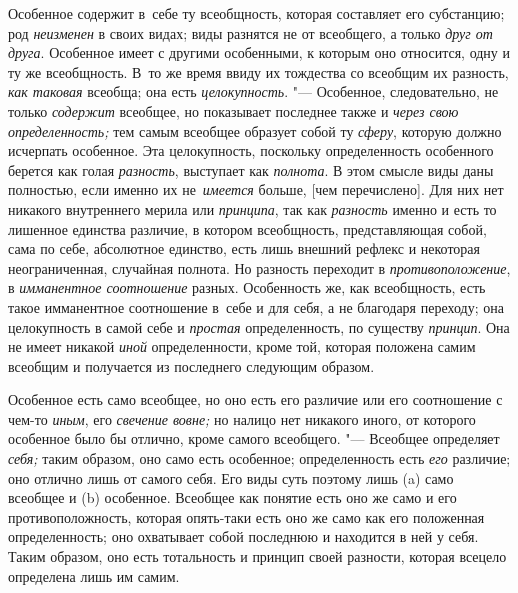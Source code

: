 Особенное содержит в~себе ту всеобщность, которая составляет его субстанцию;
род {\em неизменен} в своих видах; виды разнятся не от всеобщего, а только
{\em друг от друга}. Особенное имеет с другими особенными, к которым оно
относится, одну и ту же всеобщность. В~то же время ввиду их тождества со
всеобщим их разность,
{\em как таковая} всеобща; она есть {\em целокупность}. "--- Особенное,
следовательно, не только {\em содержит} всеобщее, но показывает последнее
также и {\em через свою определенность;} тем самым всеобщее образует собой
ту {\em сферу}, которую должно исчерпать особенное. Эта целокупность, поскольку
определенность особенного берется как голая {\em разность}, выступает как
{\em полнота}. В этом смысле виды даны полностью, если именно их
не~{\em имеется} больше, [чем перечислено]. Для них нет никакого внутреннего
мерила или {\em принципа}, так как {\em разность} именно и есть то лишенное
единства различие, в котором всеобщность, представляющая собой, сама по себе,
абсолютное единство, есть лишь внешний рефлекс и некоторая неограниченная,
случайная полнота. Но разность переходит в {\em противоположение},
в {\em имманентное соотношение} разных. Особенность же, как всеобщность, есть
такое имманентное соотношение в~себе и для себя, а не благодаря переходу; она
целокупность в самой себе и {\em простая} определенность, по существу
{\em принцип}. Она не имеет никакой {\em иной} определенности, кроме той,
которая положена самим всеобщим и получается из последнего следующим образом.

Особенное есть само всеобщее, но оно есть его различие или его
соотношение с чем-то {\em иным}, его {\em свечение
вовне;} но налицо нет никакого иного, от которого особенное было бы отлично,
кроме самого всеобщего. "--- Всеобщее определяет {\em себя;} таким
образом, оно само есть особенное; определенность есть {\em его} различие; оно
отлично лишь от самого себя. Его виды суть поэтому лишь (a)
само всеобщее и (b) особенное. Всеобщее как понятие есть оно
же само и его противоположность, которая опять-таки есть оно же само как
его положенная определенность; оно охватывает собой последнюю и находится в
ней у себя. Таким образом, оно есть тотальность и принцип своей разности,
которая всецело определена лишь им самим.

